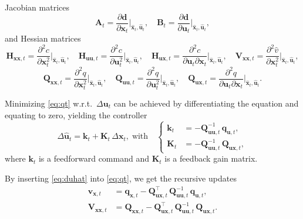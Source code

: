 \documentclass[10pt,a4paper]{article} %
\newcommand{\trsp}{{\scriptscriptstyle\top}}
\begin{document}
Jacobian matrices 
\begin{equation*}
	\bm{A}_t = \frac{\partial\bm{d}}{\partial\bm{x}_t}\Big|_{\bm{\hat{x}}_t,\bm{\hat{u}}_t}, \quad
	\bm{B}_t = \frac{\partial\bm{d}}{\partial\bm{u}_t}\Big|_{\bm{\hat{x}}_t,\bm{\hat{u}}_t},
\end{equation*}
and Hessian matrices 
\begin{equation*}
	\bm{H}_{\bm{x}\bm{x},t} \!=\! \frac{\partial^2 c}{\partial\bm{x}_t^2}\Big|_{\bm{\hat{x}}_t,\bm{\hat{u}}_t}, \quad 
	\bm{H}_{\bm{u}\bm{u},t} \!=\! \frac{\partial^2 c}{\partial\bm{u}_t^2}\Big|_{\bm{\hat{x}}_t,\bm{\hat{u}}_t}, \quad 
	\bm{H}_{\bm{u}\bm{x},t} \!=\! \frac{\partial^2 c}{\partial\bm{u}_t\partial\bm{x}_t}\Big|_{\bm{\hat{x}}_t,\bm{\hat{u}}_t}, \quad 
	\bm{V}_{\bm{x}\bm{x},t} \!=\! \frac{\partial^2 \hat{v}}{\partial\bm{x}_t^2}\Big|_{\bm{\hat{x}}_t,\bm{\hat{u}}_t},
\end{equation*}
\begin{equation*}	
	\bm{Q}_{\bm{x}\bm{x},t} = \frac{\partial^2 q}{\partial\bm{x}_t^2}\Big|_{\bm{\hat{x}}_t,\bm{\hat{u}}_t}, \quad
	\bm{Q}_{\bm{u}\bm{u},t} = \frac{\partial^2 q}{\partial\bm{u}_t^2}\Big|_{\bm{\hat{x}}_t,\bm{\hat{u}}_t}, \quad 
	\bm{Q}_{\bm{u}\bm{x},t} = \frac{\partial^2 q}{\partial\bm{u}_t\partial\bm{x}_t}\Big|_{\bm{\hat{x}}_t,\bm{\hat{u}}_t}.
\end{equation*}

Minimizing \eqref{eq:qt} w.r.t.~$\Delta\bm{u}_t$ can be achieved by differentiating the equation and equating to zero, yielding the controller
\begin{equation}
	\Delta\bm{\hat{u}}_t = \bm{k}_t + \bm{K}_t \, \Delta\bm{x}_t,
	\;\text{with}\quad
	\left\{
	\begin{aligned}
	\bm{k}_t &= - \bm{Q}_{\bm{u}\bm{u},t}^{-1} \, \bm{q}_{\bm{u},t}, \\
	\bm{K}_t &= - \bm{Q}_{\bm{u}\bm{u},t}^{-1} \, \bm{Q}_{\bm{u}\bm{x},t}, 
	\end{aligned}
	\right.
	\label{eq:duhat}
\end{equation}
where $\bm{k}_t$ is a feedforward command and $\bm{K}_t$ is a feedback gain matrix.

By inserting \eqref{eq:duhat} into \eqref{eq:qt}, we get the recursive updates
\begin{equation}
\begin{aligned}
	\bm{v}_{\bm{x},t} &= \bm{q}_{\bm{x},t} - \bm{Q}_{\bm{u}\bm{x},t}^\trsp \, \bm{Q}_{\bm{u}\bm{u},t}^{-1} \, \bm{q}_{\bm{u},t}, \\
	\bm{V}_{\bm{x}\bm{x},t} &= \bm{Q}_{\bm{x}\bm{x},t} - \bm{Q}_{\bm{u}\bm{x},t}^\trsp \, \bm{Q}_{\bm{u}\bm{u},t}^{-1} \, \bm{Q}_{\bm{u}\bm{x},t}.
\end{aligned}
\label{eq:vV} 
\end{equation}
\end{document}
